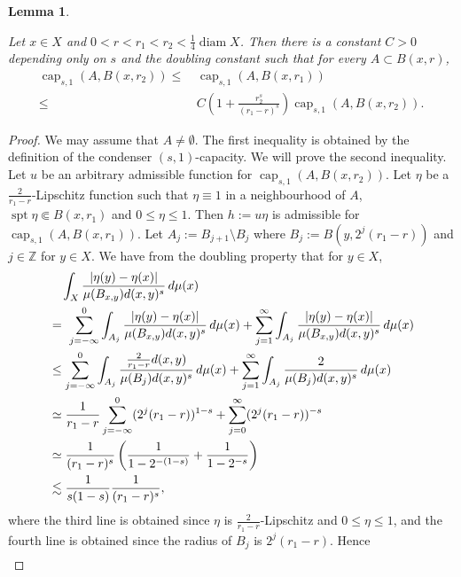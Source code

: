\documentclass[11pt,leqno]{amsart}
\newtheorem{lemma}[theorem]{Lemma}
\numberwithin{equation}{section}
\theoremstyle{definition}
\DeclareMathOperator{\capp}{cap}
\newcommand{\caps}{\capp_{s,1}}
\DeclareMathOperator{\diam}{diam}
\DeclareMathOperator{\supp}{spt}
\begin{document}
	
	\begin{lemma}\label{lem4.3-29oct}
		
		Let $x\in X$ and $0<r<r_1<r_2<\frac{1}{4}\diam X$.
		Then there is a constant $C>0$  depending only on $s$ and the doubling constant such that
		for every $A\subset B(x,r)$,
		\begin{align}
			\caps(A, B(x,r_2))\leq&\, \caps(A,B(x,r_1))\label{e4.2-29oct} \\
			\leq&\,  C\left(1+\frac{r_2^s}{(r_1-r)^s}\right)\caps(A, B(x,r_2)). \label{e4.3-29oct}
		\end{align} 
	\end{lemma}
	\begin{proof}
		We may assume that $A\neq\emptyset$.
		The first inequality is obtained by the definition of the condenser $(s,1)$-capacity.
		We will prove the second inequality. Let $u$ be an arbitrary admissible function for
		$\caps(A, B(x,r_2))$. Let $\eta$ be a $\frac{2}{r_1-r}$-Lipschitz function such that
		$\eta\equiv 1$ in a neighbourhood of $A$, $\supp \eta\Subset B(x,r_1)$ and $0\leq \eta\leq 1$.
		Then $h:=u\eta$ is admissible for $\caps(A, B(x, r_1))$.
		Let $A_j:=B_{j+1}\setminus B_{j}$ where $B_j:= B(y, 2^{j} (r_1-r))$ and $j\in\mathbb Z$ for
		$y\in X$.
		We have from the doubling property that for $y\in X$,
		\begin{align}
			&\quad \int_{X}  \frac{  |\eta(y)-\eta(x)|}{\mu(B_{x,y}) d(x,y)^s}  \,d\mu(x)\notag \\
			&= \ \sum_{j=-\infty}^0 \int_{A_j} \frac{  |\eta(y)-\eta(x)|}{\mu(B_{x,y}) d(x,y)^s}  \,d\mu(x) + \sum_{j=1}^\infty \int_{A_j} \frac{  |\eta(y)-\eta(x)|}{\mu(B_{x,y}) d(x,y)^s}  \,d\mu(x) \notag \\
			&\leq   \sum_{j=-\infty}^0 \int_{A_j} \frac{ \frac{2}{r_1-r}d(x,y) }{\mu(B_j) d(x,y)^s}  \,d\mu(x) +  \sum_{j=1}^\infty \int_{A_j} \frac{2}{\mu(B_j) d(x,y)^s}  \,d\mu(x) \notag \\
			&\simeq    \frac{1}{r_1-r}  \sum_{j=-\infty}^0 (2^{j}(r_1-r))^{1-s} +  \sum_{j=0}^\infty (2^j(r_1-r))^{-s}\notag \\
			&\simeq    \frac{1}{(r_1-r)^s} \left( \frac{1}{1-2^{-(1-s)}} + \frac{1}{1-2^{-s}} \right)\notag \\
			&\lesssim \frac{1}{s(1-s)}\frac{1}{(r_1-r)^s}, \label{eq2.6-29oct}
		\end{align}
		where the third line is obtained  since $\eta$ is $\frac{2}{r_1-r}$-Lipschitz and
		$0\leq \eta\leq 1$, and the fourth line is obtained since the radius of $B_j$ is $2^j(r_1-r)$. 
		Hence 
		\begin{align}

\end{align}
\end{proof}
\end{document}
